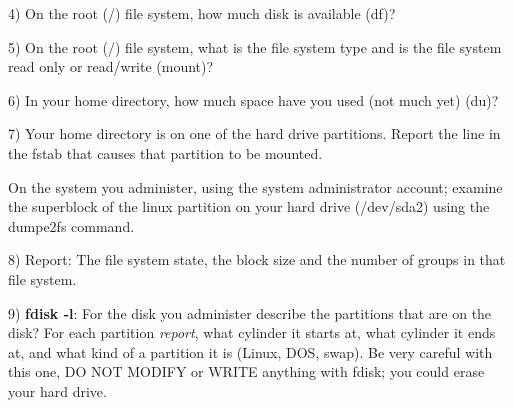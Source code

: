 4) On the root ({\ltt{}/}) file system, how much disk is available (df)?

5) On the root ({\ltt{}/}) file system, what is the file system type
and is the file system read only or read/write (mount)?

6) In your home directory, how much space have you used (not much yet) (du)?

7) Your home directory is on one of the hard drive partitions.
Report the line in the {\ltt{}fstab} that causes that partition
to be mounted.

On the system you administer, using the system administrator account;
examine the superblock of the linux partition on your hard drive
({\ltt{}/dev/sda2}) using the {\ltt{}dumpe2fs} command.

8) Report: The file system state, the block size and the number of groups
in that file system.

9) {\bf fdisk -l}:
For the disk you administer describe the partitions that are on the disk?
For each partition {\it report}, what cylinder it starts at,
what cylinder it ends at,
and what kind of a partition it is (Linux, DOS, swap).
Be very careful with this one, 
DO NOT MODIFY or WRITE anything with fdisk; 
you could erase your hard drive.

\bye
